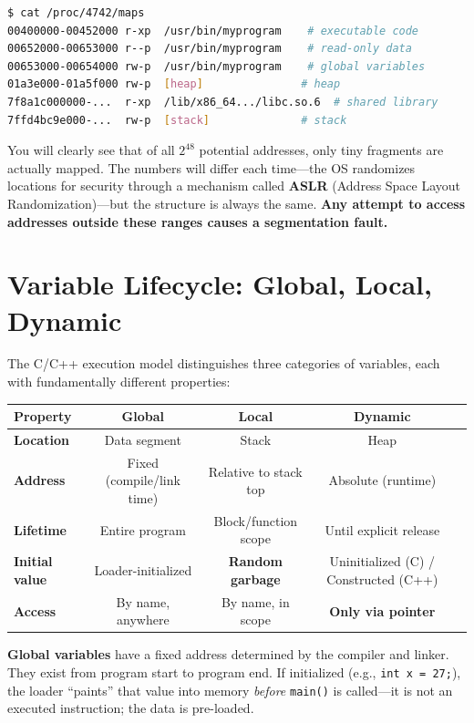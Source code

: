 \begin{lstlisting}[language=bash]
$ cat /proc/4742/maps
00400000-00452000 r-xp  /usr/bin/myprogram    # executable code
00652000-00653000 r--p  /usr/bin/myprogram    # read-only data
00653000-00654000 rw-p  /usr/bin/myprogram    # global variables
01a3e000-01a5f000 rw-p  [heap]               # heap
7f8a1c000000-...  r-xp  /lib/x86_64.../libc.so.6  # shared library
7ffd4bc9e000-...  rw-p  [stack]              # stack
\end{lstlisting}

You will clearly see that of all $2^{48}$ potential addresses, only tiny fragments are actually mapped. The numbers will differ each time---the OS randomizes locations for security through a mechanism called \textbf{ASLR} (Address Space Layout Randomization)---but the structure is always the same. \textbf{Any attempt to access addresses outside these ranges causes a segmentation fault.}

\section{Variable Lifecycle: Global, Local, Dynamic}

The C/C++ execution model distinguishes three categories of variables, each with fundamentally different properties:

\begin{center}
\begin{tabular}{|l|c|c|c|c|}
\hline
\textbf{Property} & \textbf{Global} & \textbf{Local} & \textbf{Dynamic} \\
\hline
\textbf{Location} & Data segment & Stack & Heap \\
\hline
\textbf{Address} & Fixed (compile/link time) & Relative to stack top & Absolute (runtime) \\
\hline
\textbf{Lifetime} & Entire program & Block/function scope & Until explicit release \\
\hline
\textbf{Initial value} & Loader-initialized & \textbf{Random garbage} & Uninitialized (C) / Constructed (C++) \\
\hline
\textbf{Access} & By name, anywhere & By name, in scope & \textbf{Only via pointer} \\
\hline
\end{tabular}
\end{center}

\textbf{Global variables} have a fixed address determined by the compiler and linker. They exist from program start to program end. If initialized (e.g., \texttt{int x = 27;}), the loader ``paints'' that value into memory \emph{before} \texttt{main()} is called---it is not an executed instruction; the data is pre-loaded.

